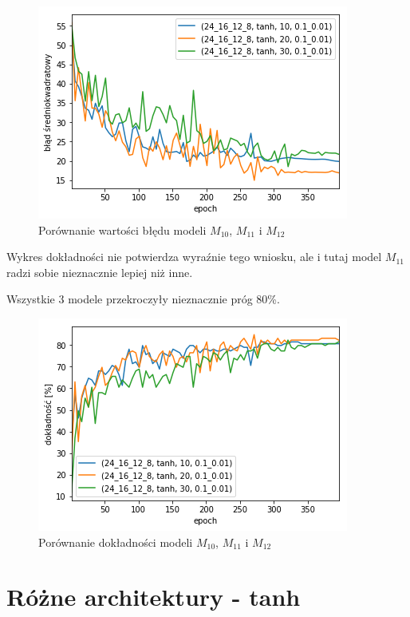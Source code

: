 \documentclass{report}
\begin{document}
    \begin{figure}[htp]
        \centering
        \includegraphics[scale=0.8]{./img/feat-error-tanh.png}
        \caption{Porównanie wartości błędu modeli $M_{10}$, $M_{11}$ i $M_{12}$}
    \end{figure}

    Wykres dokładności nie potwierdza wyraźnie tego wniosku, ale i tutaj model $M_{11}$ radzi sobie nieznacznie lepiej niż inne.

    Wszystkie 3 modele przekroczyły nieznacznie próg 80\%.

    \begin{figure}[htp]
        \centering
        \includegraphics[scale=0.8]{././img/feat-accuracy-tanh.png}
        \caption{Porównanie dokładności modeli $M_{10}$, $M_{11}$ i $M_{12}$}
    \end{figure}

    \section{Różne architektury - tanh}\label{sec:różneArchitektury-Tanh}
\end{document}

